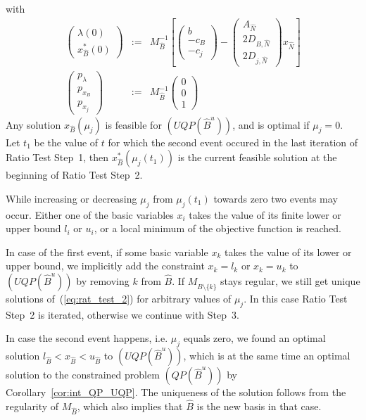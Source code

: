 \documentclass[a4paper]{article}
\begin{document}
with
\begin{eqnarray}
\left(
\begin{array}{c}
\lambda(0) \\
\hline
x_{\hat{B}}^{*}(0)
\end{array}
\right)
&:=&
M_{\hat{B}}^{-1}
\left[
\left(
\begin{array}{c}
b \\
\hline
-c_{B} \\
\hline
-c_{j}
\end{array}
\right)
-
\left(
\begin{array}{c}
A_{\hat{N}} \\
\hline
2D_{B, \hat{N}} \\
\hline
2D_{j, \hat{N}}
\end{array}
\right)
x_{\hat{N}}
\right]
\\
\left(
\begin{array}{c}
p_{\lambda} \\
\hline
p_{x_{B}} \\
\hline
p_{x_{j}}
\end{array}
\right)
&:=&
M_{\hat{B}}^{-1}
\left(
\begin{array}{c}
0 \\
\hline
0 \\
\hline
1
\end{array}
\right)
\end{eqnarray}
Any solution $x_{\hat{B}}(\mu_{j})$ is feasible for $(UQP(\hat{B}^{u}))$, and is
optimal if $\mu_{j}=0$. Let $t_{1}$ be the value of $t$ for which the second
event occured in the last iteration of Ratio Test Step~1, then
$x_{\hat{B}}^{*}(\mu_{j}(t_{1}))$ is the current feasible solution at the
beginning of Ratio Test Step~2.

While increasing or decreasing $\mu_{j}$ from $\mu_{j}(t_{1})$ towards zero
two events may occur. Either one of the basic variables $x_{i}$
takes the value of its finite lower or upper bound $l_{i}$ or $u_{i}$, or a
local minimum of the objective function is reached.

In case of the first event, if some basic variable $x_{k}$ takes the value of
its lower or upper bound, we implicitly add the constraint $x_{k}=l_{k}$ or
$x_{k}=u_{k}$ to $(UQP(\hat{B}^{u}))$ by removing $k$ from $\hat{B}$. If
$M_{\hat{B}\setminus \{k\}}$ stays regular, we still get unique solutions
of~(\ref{eq:rat_test_2})
for arbitrary values of $\mu_{j}$. In this case Ratio Test Step~2 is iterated,
otherwise we continue with Step~3.  

In case the second event happens, i.e. $\mu_{j}$ equals zero, we found an
optimal solution $l_{\hat{B}} < x_{\hat{B}} < u_{\hat{B}}$
to $(UQP(\hat{B}^{u}))$,
which is at the same time an optimal solution to the constrained problem
$(QP(\hat{B}^{u}))$ by Corollary~\ref{cor:int_QP_UQP}. The uniqueness of the
solution follows from the regularity of $M_{\hat{B}}$, which also implies that
$\hat{B}$ is the new basis in that case.
\end{document}
